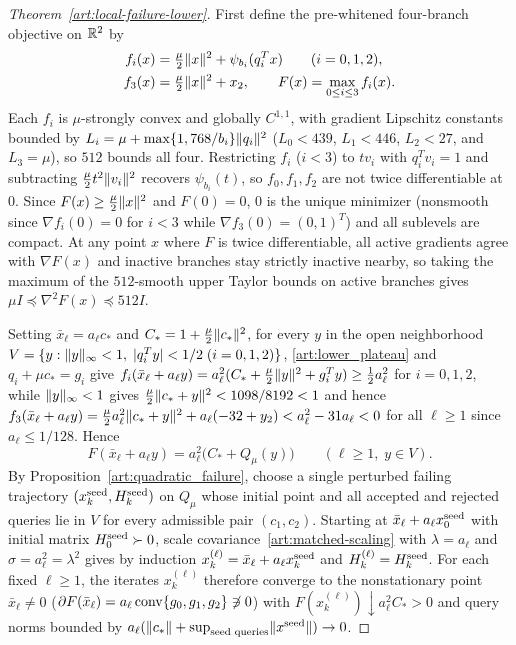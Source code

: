 \begin{proof}[Theorem~\ref{art:local-failure-lower}]
First define the pre-whitened four-branch objective on $\mathbb R^2$ by
\begin{equation}\label{art:lower_objective}
 \begin{aligned}
 f_i(x)&=\tfrac\mu2\lVert x\rVert^2+\psi_{b_i}(q_i^Tx)\qquad(i=0,1,2),\\
 f_3(x)&=\tfrac\mu2\lVert x\rVert^2+x_2,\qquad F(x)=\max_{0\le i\le3}f_i(x).
 \end{aligned}
\end{equation}
Each $f_i$ is $\mu$-strongly convex and globally $C^{1,1}$, with gradient
Lipschitz constants bounded by $L_i=\mu+\max\{1,768/b_i\}\lVert q_i\rVert^2$ ($L_0<439$,
$L_1<446$, $L_2<27$, and $L_3=\mu$), so $512$ bounds all four. Restricting $f_i$
($i<3$) to $tv_i$ with $q_i^Tv_i=1$ and subtracting $\tfrac\mu2t^2\lVert v_i\rVert^2$
recovers $\psi_{b_i}(t)$, so $f_0,f_1,f_2$ are not twice differentiable at $0$.
Since $F(x)\ge\tfrac\mu2\lVert x\rVert^2$ and $F(0)=0$, $0$ is the unique minimizer
(nonsmooth since $\nabla f_i(0)=0$ for $i<3$ while $\nabla f_3(0)=(0,1)^T$) and
all sublevels are compact. At any point $x$ where $F$ is twice differentiable,
all active gradients agree with $\nabla F(x)$ and inactive branches stay
strictly inactive nearby, so taking the maximum of the $512$-smooth upper Taylor
bounds on active branches gives $\mu I\preceq\nabla^2F(x)\preceq512I$.

Setting $\bar x_\ell=a_\ell c_*$ and $C_*=1+\tfrac\mu2\lVert c_*\rVert^2$, for every
$y$ in the open neighborhood $V=\{y:\lVert y\rVert_\infty<1,\;|q_i^Ty|<1/2\;(i=0,1,2)\}$,
\eqref{art:lower_plateau} and $q_i+\mu c_*=g_i$ give
$f_i(\bar x_\ell+a_\ell y)=a_\ell^2(C_*+\tfrac\mu2\lVert y\rVert^2+g_i^Ty)\ge\tfrac12a_\ell^2$
for $i=0,1,2$, while $\lVert y\rVert_\infty<1$ gives $\tfrac\mu2\lVert c_*+y\rVert^2<1098/8192<1$
and hence $f_3(\bar x_\ell+a_\ell y)=\tfrac\mu2a_\ell^2\lVert c_*+y\rVert^2+a_\ell(-32+y_2)<a_\ell^2-31a_\ell<0$
for all $\ell\ge1$ since $a_\ell\le1/128$. Hence
\begin{equation}\label{art:lower_local_model}
 F(\bar x_\ell+a_\ell y)=a_\ell^2\bigl(C_*+Q_\mu(y)\bigr)
 \qquad(\ell\ge1,\;y\in V).
\end{equation}
By Proposition~\ref{art:quadratic_failure}, choose a single perturbed failing
trajectory $(x_k^{\rm seed},H_k^{\rm seed})$ on $Q_\mu$ whose initial point and
all accepted and rejected queries lie in $V$ for every admissible pair
$(c_1,c_2)$. Starting at $\bar x_\ell+a_\ell x_0^{\rm seed}$ with initial matrix
$H_0^{\rm seed}\succ0$, scale covariance~\eqref{art:matched-scaling} with
$\lambda=a_\ell$ and $\sigma=a_\ell^2=\lambda^2$ gives by induction
$x_k^{(\ell)}=\bar x_\ell+a_\ell x_k^{\rm seed}$ and $H_k^{(\ell)}=H_k^{\rm seed}$.
For each fixed $\ell\ge1$, the iterates $x_k^{(\ell)}$ therefore converge to the
nonstationary point $\bar x_\ell\ne0$ ($\partial F(\bar x_\ell)=a_\ell\operatorname{conv}\{g_0,g_1,g_2\}\not\ni0$)
with $F(x_k^{(\ell)})\downarrow a_\ell^2C_*>0$ and query norms bounded by
$a_\ell(\lVert c_*\rVert+\sup_{\text{seed queries}}\lVert x^{\rm seed}\rVert)\to0$.


\end{proof}
